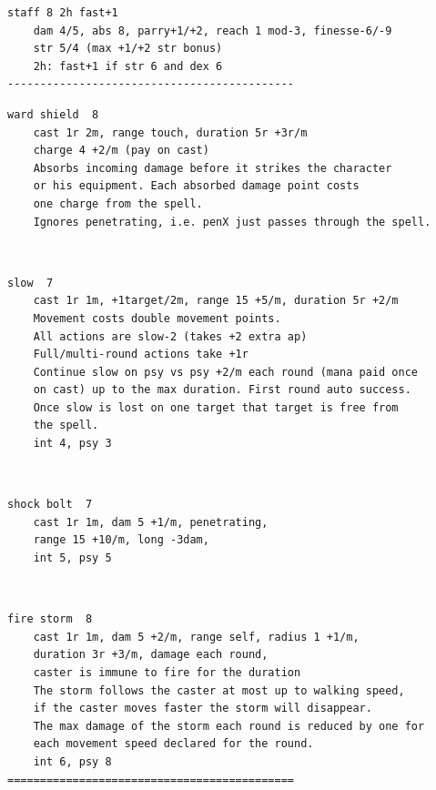 \begin{samepage}
\begin{verbatim}
staff 8 2h fast+1
    dam 4/5, abs 8, parry+1/+2, reach 1 mod-3, finesse-6/-9
    str 5/4 (max +1/+2 str bonus)
    2h: fast+1 if str 6 and dex 6
--------------------------------------------
\end{verbatim} \begin{samepage} \goodbreak \end{samepage} \begin{verbatim}
ward shield  8
    cast 1r 2m, range touch, duration 5r +3r/m
    charge 4 +2/m (pay on cast)
    Absorbs incoming damage before it strikes the character
    or his equipment. Each absorbed damage point costs
    one charge from the spell.
    Ignores penetrating, i.e. penX just passes through the spell.
\end{verbatim} \begin{samepage}   \   \goodbreak \end{samepage} \begin{verbatim}
slow  7
    cast 1r 1m, +1target/2m, range 15 +5/m, duration 5r +2/m
    Movement costs double movement points.
    All actions are slow-2 (takes +2 extra ap)
    Full/multi-round actions take +1r
    Continue slow on psy vs psy +2/m each round (mana paid once
    on cast) up to the max duration. First round auto success.
    Once slow is lost on one target that target is free from 
    the spell.
    int 4, psy 3
\end{verbatim} \begin{samepage}   \   \goodbreak \end{samepage} \begin{verbatim}
shock bolt  7
    cast 1r 1m, dam 5 +1/m, penetrating,
    range 15 +10/m, long -3dam,
    int 5, psy 5
\end{verbatim} \begin{samepage}   \   \goodbreak \end{samepage} \begin{verbatim}
fire storm  8
    cast 1r 1m, dam 5 +2/m, range self, radius 1 +1/m,
    duration 3r +3/m, damage each round,
    caster is immune to fire for the duration
    The storm follows the caster at most up to walking speed,
    if the caster moves faster the storm will disappear.
    The max damage of the storm each round is reduced by one for
    each movement speed declared for the round.
    int 6, psy 8
============================================
\end{verbatim} \end{samepage} \normalsize

\


